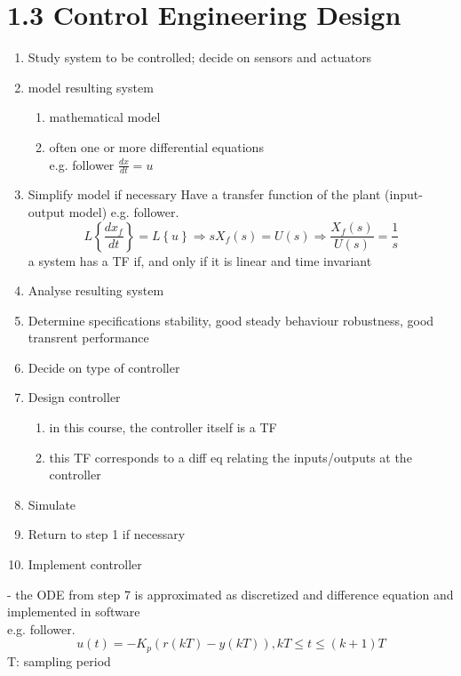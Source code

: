 \documentclass[12pt, a4paper]{article}
\begin{document}
\section*{1.3 Control Engineering Design}
\begin{enumerate}
  \item Study system to be controlled; decide on sensors and actuators
  \item model resulting system
  \begin{enumerate}
    \item mathematical model
    \item often one or more differential equations\\
    e.g. follower $\frac{dx}{dt}=u$
  \end{enumerate}
  \item Simplify model if necessary
  Have a transfer function of the plant (input-output model)
e.g. follower. $$L\left \{\frac{dx_f}{dt} \right \}=L\left \{u \right\}\Rightarrow sX_f(s)=U(s)\Rightarrow\frac{X_f(s)}{U(s)}=\frac{1}{s}$$
a system has a TF if, and only if it is linear and time invariant
  \item Analyse resulting system
  \item Determine specifications stability, good steady behaviour robustness, good transrent performance
  \item Decide on type of controller
  \item Design controller
  \begin{enumerate}
    \item in this course, the controller itself is a TF
    \item this TF corresponds to a diff eq relating the inputs/outputs at the controller
  \end{enumerate}
  \item Simulate
  \item Return to step 1 if necessary
  \item Implement controller
\end{enumerate}
- the ODE from step 7 is approximated as discretized and difference equation and implemented in software\\
e.g. follower. $$u(t)=-K_p(r(kT)-y(kT)), kT\leq t\le (k+1)T$$
T: sampling period
\end{document}
